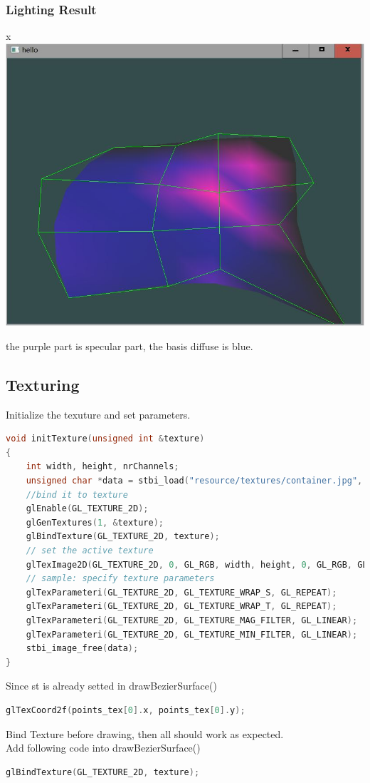 \documentclass[acmtog]{acmart}
\begin{document}
\subsubsection{Lighting Result}x\\
\includegraphics[scale=0.5]{2}
\par the purple part is specular part, the basis diffuse is blue.
\subsection{Texturing}
Initialize the texuture and set parameters.
\begin{lstlisting}[frame=single,breaklines=true,language=c++,basicstyle=\footnotesize\ttfamily]
void initTexture(unsigned int &texture)
{
	int width, height, nrChannels;
	unsigned char *data = stbi_load("resource/textures/container.jpg", &width, &height, &nrChannels, 0);
	//bind it to texture
	glEnable(GL_TEXTURE_2D);
	glGenTextures(1, &texture);
	glBindTexture(GL_TEXTURE_2D, texture);
	// set the active texture
	glTexImage2D(GL_TEXTURE_2D, 0, GL_RGB, width, height, 0, GL_RGB, GL_UNSIGNED_BYTE, data);
	// sample: specify texture parameters
	glTexParameteri(GL_TEXTURE_2D, GL_TEXTURE_WRAP_S, GL_REPEAT);
	glTexParameteri(GL_TEXTURE_2D, GL_TEXTURE_WRAP_T, GL_REPEAT);
	glTexParameteri(GL_TEXTURE_2D, GL_TEXTURE_MAG_FILTER, GL_LINEAR);
	glTexParameteri(GL_TEXTURE_2D, GL_TEXTURE_MIN_FILTER, GL_LINEAR);
	stbi_image_free(data);
}
\end{lstlisting}
Since st is already setted in drawBezierSurface()
\begin{lstlisting}[frame=single,breaklines=true,language=c++,basicstyle=\footnotesize\ttfamily]
glTexCoord2f(points_tex[0].x, points_tex[0].y);
\end{lstlisting}
Bind Texture before drawing, then all should work as expected.\\
Add following code into  drawBezierSurface()
\begin{lstlisting}[frame=single,breaklines=true,language=c++,basicstyle=\footnotesize\ttfamily]
glBindTexture(GL_TEXTURE_2D, texture);
\end{lstlisting}
\end{document}
